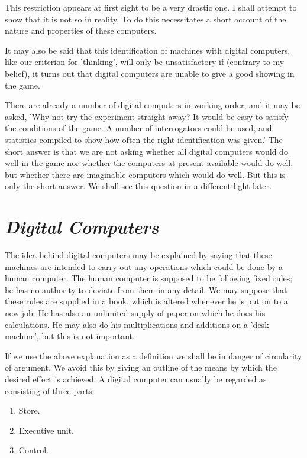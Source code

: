 \documentclass[12pt]{article}
\begin{document}
    This restriction appears at first sight to be a very drastic one. I shall attempt to show that it is not so in reality. To do this necessitates a short account of the nature and properties of these computers.

    It may also be said that this identification of machines with digital computers, like our criterion for 'thinking', will only be unsatisfactory if (contrary to my belief), it turns out that digital computers are unable to give a good showing in the game.

    There are already a number of digital computers in working order, and it may be asked, 'Why not try the experiment straight away? It would be easy to satisfy the conditions of the game. A number of interrogators could be used, and statistics compiled to show how often the right identification was given.' The short answer is that we are not asking whether all digital computers would do well in the game nor whether the computers at present available would do well, but whether there are imaginable computers which would do well. But this is only the short answer. We shall see this question in a different light later.

    \section{\textit{Digital Computers}}
    The idea behind digital computers may be explained by saying that these machines are intended to carry out any operations which could be done by a human computer. The human computer is supposed to be following fixed rules; he has no authority to deviate from them in any detail. We may suppose that these rules are supplied in a book, which is altered whenever he is put on to a new job. He has also an unlimited supply of paper on which he does his calculations. He may also do his multiplications and additions on a 'desk machine', but this is not important.

    If we use the above explanation as a definition we shall be in danger of circularity of argument. We avoid this by giving an outline of the means by which the desired effect is achieved. A digital computer can usually be regarded as consisting of three parts:
    \vspace{\baselineskip}

    \begin{enumerate}[label=(\roman*)]
        \item{Store.}
        \item{Executive unit.}
        \item{Control.}
    \end{enumerate}
\end{document}
